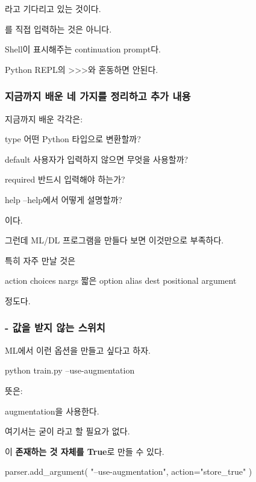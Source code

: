 라고 기다리고 있는 것이다.

\zsh{ > }를 직접 입력하는 것은 아니다.

Shell이 표시해주는 continuation prompt다.

Python REPL의 >>>와 혼동하면 안된다.

\subsubsection{지금까지 배운 네 가지를 정리하고 추가 내용}

지금까지 배운 각각은:

\begin{dhksmry}[centered]
type
\ra 어떤 Python 타입으로 변환할까?

default
\ra 사용자가 입력하지 않으면 무엇을 사용할까?

required
\ra 반드시 입력해야 하는가?

help
\ra --help에서 어떻게 설명할까?
\end{dhksmry}

이다.

그런데 ML/DL 프로그램을 만들다 보면 이것만으로 부족하다.

특히 자주 만날 것은

\begin{dhkzsh}
action
choices
nargs
짧은 option alias
dest
positional argument
\end{dhkzsh}

정도다.

\subsubsection{ - 값을 받지 않는 스위치}

ML에서 이런 옵션을 만들고 싶다고 하자.

\begin{dhkzsh}
python train.py --use-augmentation
\end{dhkzsh}

뜻은:
\begin{dhksmry}[centered]
augmentation을 사용한다.
\end{dhksmry}

여기서는 굳이 라고 할 필요가 없다.

이 \textbf{존재하는 것 자체를 True}로 만들 수 있다.

\begin{dhkcode}
parser.add_argument(
    "--use-augmentation",
    action="store_true"
)
\end{dhkcode}

